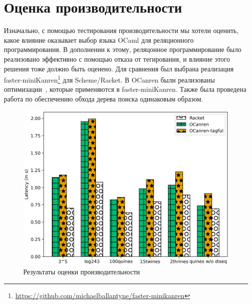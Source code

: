 

\section{Оценка производительности}
\label{sec:evaluation}

Изначально, с помощью тестирования производительности мы хотели оценить, какое влияние оказывает выбор языка OCaml для реляционного программирования.
В дополнении к этому, реляцонное программирование было реализовано эффективно с помощью отказа от тегирования, и влияние этого решения тоже должно быть оценено.
Для сравнения был выбрана реализация faster-miniKanren\footnote{\url{https://github.com/michaelballantyne/faster-minikanren}} для Scheme/Racket.
В OCanren были реализованы оптимизации~\cite{WillThesis, Optimizations}, которые применяются в faster-miniKanren.
Также была проведена работа по обеспечению обхода дерева поиска одинаковым образом.
%

\begin{figure}[t]
\centering
\includegraphics[scale=0.8]{graph.png}
\caption{Результаты оценки производительности}
\label{eval}
\end{figure}

